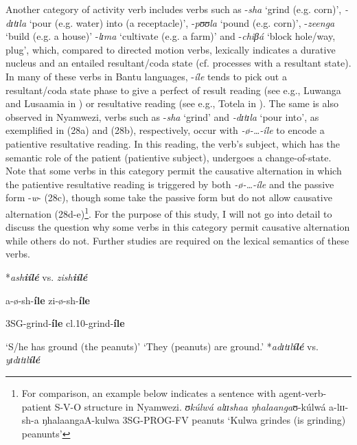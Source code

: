 \documentclass[output=paper]{langscibook}
\begin{document}
Another category of activity verb includes verbs such as -\textit{sha} ‘grind (e.g. corn)’, \textit{-dɪ}\textit{tɪ}\textit{la} ‘pour (e.g. water) into (a receptacle)’, -\textit{pʊʊ}\textit{la} ‘pound (e.g. corn)’, -\textit{zeenga} ‘build (e.g. a house)’ -\textit{lɪ}\textit{ma} ‘cultivate (e.g. a farm)’ and -\textit{chiβá} ‘block hole/way, plug’, which, compared to directed motion verbs, lexically indicates a durative nucleus and an entailed resultant/coda state (cf.  processes with a resultant state). In many of these verbs in Bantu languages, -\textit{íle} tends to pick out a resultant/coda state phase to give a perfect of result reading (see e.g., Luwanga and Lusaamia in \citet{Botne2010}) or resultative reading (see e.g., Totela in \citet{Crane2013}). The same is also observed in Nyamwezi, verbs such as -\textit{sha} ‘grind’ and \textit{-dɪ}\textit{tɪ}\textit{la} ‘pour into’, as exemplified in (28a) and (28b), respectively, occur with \textit{-ø}\textit{-…-íle} to encode a patientive resultative reading. In this reading, the verb’s subject, which has the semantic role of the patient (patientive subject), undergoes a change-of-state. Note that some verbs in this category permit the causative alternation in which the patientive resultative reading is triggered by both \textit{-ø}\textit{-…-íle} and the passive form -\textit{w}- (28c), though some take the passive form but do not allow causative alternation (28d-e)\footnote{For comparison, an example below indicates a sentence with agent-verb-patient S-V-O structure in Nyamwezi.       \textit{ʊkúlwá}    \textit{al}\textit{ɪɪshaa}          \textit{ŋhalaanga}ʊ-kúlwá  a-lɪɪ-sh-a         ŋhalaangaA-kulwa 3SG-PROG-FV peanuts ‘Kulwa grindes (is grinding) peanunts’}. For the purpose of this study, I will not go into detail to discuss the question why some verbs in this category permit causative alternation while others do not. Further studies are required on the lexical semantics of these verbs. 

\ea
\ea
*\textit{ash}\textbf{\textit{iílé}}       vs.  \textit{zish}\textbf{\textit{iílé}}

\textbf{ }a-ø-sh-\textbf{íle}         zi-ø-sh-\textbf{íle}

 3SG-grind-\textbf{íle}      cl.10-grind-\textbf{íle}

 ‘S/he has ground (the peanuts)’  ‘They (peanuts) are ground.’
\ex
*\textit{adɪ}\textit{tɪ}\textit{l}\textbf{\textit{ílé}}       vs.  \textit{yɪ}\textit{dɪ}\textit{tɪ}\textit{l}\textbf{\textit{ílé}}
\end{document}
